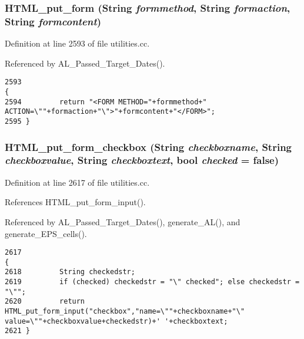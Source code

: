 \subsubsection{ HTML\_\-put\_\-form ({\bf String} {\em formmethod}, {\bf String} {\em formaction}, {\bf String} {\em formcontent})}\label{utilities_8cc_a70}




Definition at line 2593 of file utilities.cc.

Referenced by AL\_\-Passed\_\-Target\_\-Dates().



\footnotesize\begin{verbatim}2593                                                                                {
2594         return "<FORM METHOD="+formmethod+" ACTION=\""+formaction+"\">"+formcontent+"</FORM>";
2595 }
\end{verbatim}\normalsize 
{}
\subsubsection{ HTML\_\-put\_\-form\_\-checkbox ({\bf String} {\em checkboxname}, {\bf String} {\em checkboxvalue}, {\bf String} {\em checkboxtext}, bool {\em checked} = {\bf false})}\label{utilities_8cc_a75}




Definition at line 2617 of file utilities.cc.

References HTML\_\-put\_\-form\_\-input().

Referenced by AL\_\-Passed\_\-Target\_\-Dates(), generate\_\-AL(), and generate\_\-EPS\_\-cells().



\footnotesize\begin{verbatim}2617                                                                                                                     {
2618         String checkedstr;
2619         if (checked) checkedstr = "\" checked"; else checkedstr = "\"";
2620         return HTML_put_form_input("checkbox","name=\""+checkboxname+"\" value=\""+checkboxvalue+checkedstr)+' '+checkboxtext;
2621 }
\end{verbatim}\normalsize 
{}
